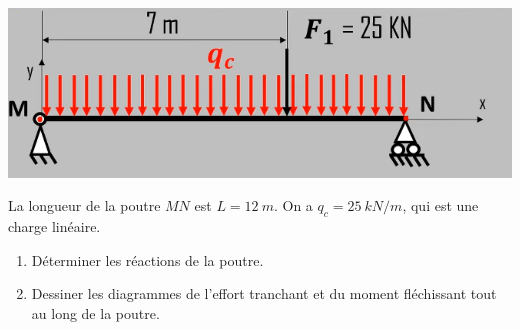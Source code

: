 \documentclass[lecture.tex]{subfiles}
\begin{document}
\exercice{}

\begin{center}
  \includegraphics[scale=0.5]{figA0034.png}
\end{center}

La longueur de la poutre $MN$ est $L=12 \ m$. On a $q_{c}=25 \ kN / m$, qui est une charge linéaire.

\begin{enumerate}
    \item Déterminer les réactions de la poutre.
    \item Dessiner les diagrammes de l'effort tranchant et du moment fléchissant tout au long de la poutre.
\end{enumerate}

\finexercice
\end{document}
